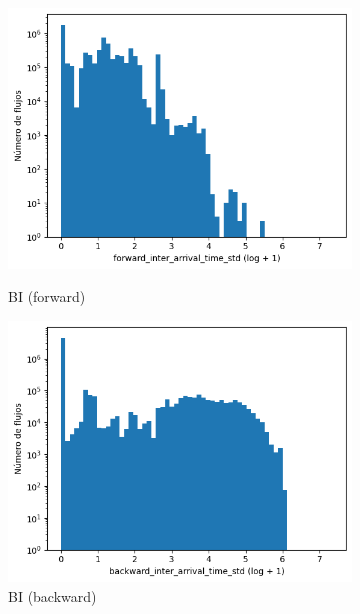 \begin{figure}[H]
\begin{subfigure}[b]{0.26\textwidth}
        \includegraphics[width=\textwidth]{media/packet_pincer_botiot/forward_inter_arrival_time_std_log_x_log_y.png}
        \caption{BI (forward)}
        \includegraphics[width=\textwidth]{media/packet_pincer_botiot/backward_inter_arrival_time_std_log_x_log_y.png}
        \caption{BI (backward)}
    \end{subfigure}
    \hfill
    \begin{subfigure}[b]{0.26\textwidth}
        \centering

\end{subfigure}
\end{figure}
